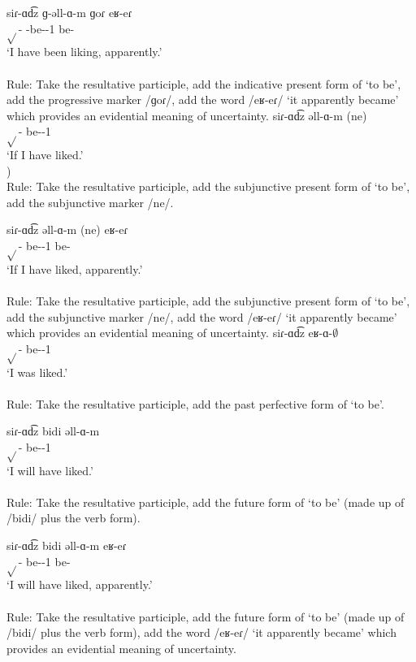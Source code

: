 \begin{exe}
\begin{xlist}
		\ex \gll 
		siɾ-ɑd͡z ɡ-əll-ɑ-m ɡoɾ eʁ-eɾ \\
		$\sqrt{}$-{\rptcp} {\ind}-be-{\thgloss}-1{\sg} {\prog} be-{\eptcp} \\
		\trans `I have been liking, apparently.' \\
		 \\
		Rule: Take the resultative participle, add the indicative present form of `to be', add the progressive marker /ɡoɾ/, add the word /eʁ-eɾ/ `it apparently became' which provides an evidential meaning of uncertainty.
		\ex \gll siɾ-ɑd͡z əll-ɑ-m (ne) \\
		$\sqrt{}$-{\rptcp} be-{\thgloss}-1{\sg} {\sbjv} \\
		\trans `If I have liked.' \\
		) \\
		Rule: Take the resultative participle, add the subjunctive present form of `to be', add the subjunctive marker /ne/.
		
		\ex \gll siɾ-ɑd͡z əll-ɑ-m (ne) eʁ-eɾ \\
		$\sqrt{}$-{\rptcp} be-{\thgloss}-1{\sg} {\sbjv} be-{\eptcp} \\
		\trans `If I have liked, apparently.' \\
		 \\
		Rule: Take the resultative participle, add the subjunctive present form of `to be', add the subjunctive marker /ne/, add the word /eʁ-eɾ/ `it apparently became' which provides an evidential meaning of uncertainty.
		\ex \gll siɾ-ɑd͡z eʁ-ɑ-$\emptyset$ \\
		$\sqrt{}$-{\rptcp} be-{\pst}-1{\sg}\\
		\trans `I was liked.' \\
		 \\
		Rule: Take the resultative participle, add the past perfective form of `to be'. 
		
		\ex \gll siɾ-ɑd͡z bidi əll-ɑ-m \\
		$\sqrt{}$-{\rptcp} {\fut} be-{\thgloss}-1{\sg} \\
		\trans `I will have liked.' \\
		 \\
		Rule: Take the resultative participle, add the future form of `to be' (made up of /bidi/ plus the verb form). 
		
		\ex \gll siɾ-ɑd͡z bidi əll-ɑ-m eʁ-eɾ \\
		$\sqrt{}$-{\rptcp} {\fut} be-{\thgloss}-1{\sg} be-{\eptcp}\\
		\trans `I will have liked, apparently.' \\
		 \\
		Rule: Take the resultative participle, add the future form of `to be' (made up of /bidi/ plus the verb form), add the word /eʁ-eɾ/ `it apparently became' which provides an evidential meaning of uncertainty. 
		

\end{xlist}
\end{exe}
